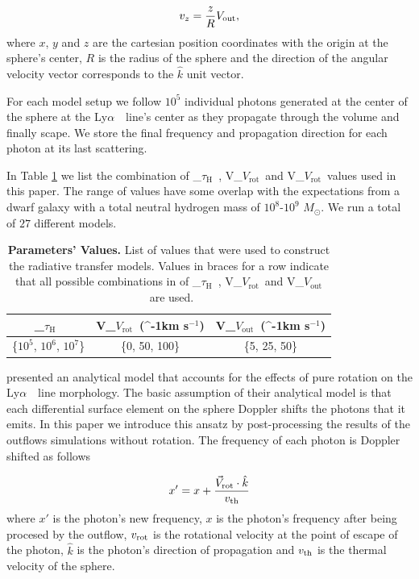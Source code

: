 \documentclass[a4paper,fleqn,usenatbib]{mnras}
\newcommand{\lya}{\ifmmode{{\rm Ly}\alpha}\else Ly$\alpha$\ \fi}
\newcommand{\kms}{\ifmmode\mathrm{km\ s}^{-1}\else km s$^{-1}$\fi}
\newcommand{\vrot}{\ifmmode\mathrm V_{\mathrm{rot}}\else $V_{\mathrm{rot}}$~\fi}
\newcommand{\vout}{\ifmmode\mathrm V_{\mathrm{out}}\else $V_{\mathrm{out}}$~\fi}
\newcommand{\tauh}{\ifmmode\mathrm \tau_{\mathrm{H}}\else $\tau_{\mathrm{H}}$~\fi}
\begin{document}
\begin{equation}
	v_{z}=\frac{z}{R}V_{\rm out},
	\label{eq:vz}
\end{equation}
%
where $x$, $y$ and $z$ are the cartesian position coordinates with the
origin at the sphere's center, $R$ is the radius of the sphere and the
direction of the angular velocity vector corresponds to the $\hat{k}$
unit vector.

For each model setup we follow $10^5$ individual photons generated at
the center of the sphere at the \lya\ line's center as they propagate
through the volume and finally scape.
We store the final frequency and propagation direction for each photon
at its last scattering.

In Table \ref{tab:values} we list the combination of \tauh,
\vrot and \vrot values used in this paper.
The range of values have some overlap with the expectations from a dwarf
galaxy with a total neutral hydrogen mass of $10^8$-$10^9$ $M_{\odot}$.
We run a total of $27$ different models.

\begin{table}
  \begin{center}
    \begin{tabular}{|c|c|c|}
      \hline
      \tauh & \vrot (\kms) & \vout (\kms) \\
      \hline
      \{$10^5$, $10^6$, $10^7$\}  & \{0, 50, 100\} & \{5, 25, 50\} \\
      \hline
    \end{tabular}
  \end{center}
  \caption{\textbf{Parameters' Values.} List of values that were used
    to construct the radiative transfer models. Values in braces
    for a row indicate that all possible combinations in of
    \tauh, \vrot and \vout are used.}
  \label{tab:values}
\end{table}



\cite{Garavito14} presented an analytical model that
accounts for the effects of pure rotation on the
\lya\ line morphology. 
The basic assumption of their analytical model is that each
differential surface element on the sphere Doppler shifts the photons
that it emits.
In this paper we introduce this ansatz by post-processing the results
of the outflows simulations without rotation.
The frequency of each photon is Doppler shifted as follows

\begin{equation}
x' = x + \frac{\vec{V}_{\rm rot}\cdot\hat{k}}{v_{\rm th}}
\label{eq:shift_x}
\end{equation}
%
where $x'$ is the photon's new frequency, $x$ is the photon's
frequency after being procesed by the outflow, $v_{\rm rot}$ is the 
rotational velocity at the point of escape of the photon, $\hat{k}$ is
the photon's direction of propagation and $v_{\rm th}$ is the thermal
velocity of the sphere.
\end{document}
